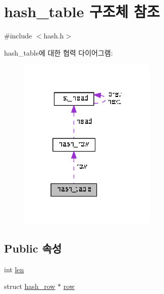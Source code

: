 \hypertarget{structhash__table}{\section{hash\+\_\+table 구조체 참조}
\label{structhash__table}
}


{\ttfamily \#include $<$hash.\+h$>$}



hash\+\_\+table에 대한 협력 다이어그램\+:\nopagebreak
\begin{figure}[H]
\begin{center}
\leavevmode
\includegraphics[width=187pt]{structhash__table__coll__graph}
\end{center}
\end{figure}
\subsection*{Public 속성}
\begin{DoxyCompactItemize}
\item 
int \hyperlink{structhash__table_a5c37715c358be0aea139f968bd44d3ae}{len}
\item 
struct \hyperlink{structhash__row}{hash\+\_\+row} $\ast$ \hyperlink{structhash__table_a634ff501f78f223799d4923fbcbbf30d}{row}
\end{DoxyCompactItemize}


